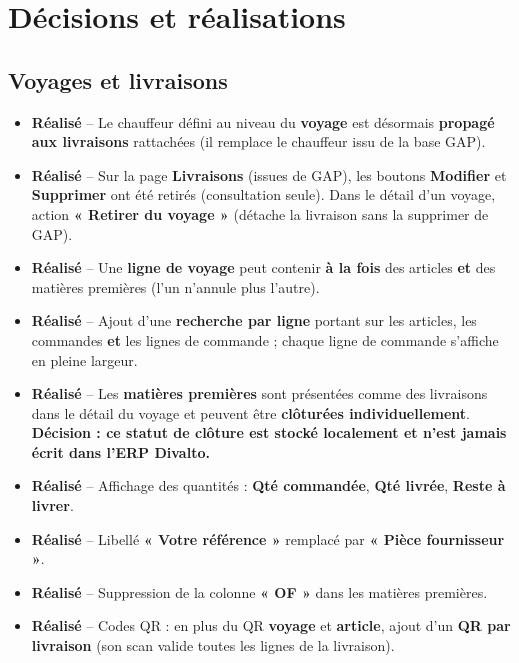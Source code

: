 \documentclass[11pt,a4paper]{article}
\newcommand{\fait}{\textcolor{vert}{\textbf{Réalisé}}}
\begin{document}
\section{Décisions et réalisations}

\subsection{Voyages et livraisons}
\begin{itemize}[leftmargin=*, itemsep=2pt]
  \item \fait{} -- Le chauffeur défini au niveau du \textbf{voyage} est désormais \textbf{propagé aux livraisons} rattachées (il remplace le chauffeur issu de la base GAP).
  \item \fait{} -- Sur la page \textbf{Livraisons} (issues de GAP), les boutons \textbf{Modifier} et \textbf{Supprimer} ont été retirés (consultation seule). Dans le détail d'un voyage, action \textbf{« Retirer du voyage »} (détache la livraison sans la supprimer de GAP).
  \item \fait{} -- Une \textbf{ligne de voyage} peut contenir \textbf{à la fois} des articles \textbf{et} des matières premières (l'un n'annule plus l'autre).
  \item \fait{} -- Ajout d'une \textbf{recherche par ligne} portant sur les articles, les commandes \textbf{et} les lignes de commande ; chaque ligne de commande s'affiche en pleine largeur.
  \item \fait{} -- Les \textbf{matières premières} sont présentées comme des livraisons dans le détail du voyage et peuvent être \textbf{clôturées individuellement}. \textbf{Décision : ce statut de clôture est stocké localement et n'est jamais écrit dans l'ERP Divalto.}
  \item \fait{} -- Affichage des quantités : \textbf{Qté commandée}, \textbf{Qté livrée}, \textbf{Reste à livrer}.
  \item \fait{} -- Libellé \textbf{« Votre référence »} remplacé par \textbf{« Pièce fournisseur »}.
  \item \fait{} -- Suppression de la colonne \textbf{« OF »} dans les matières premières.
  \item \fait{} -- Codes QR : en plus du QR \textbf{voyage} et \textbf{article}, ajout d'un \textbf{QR par livraison} (son scan valide toutes les lignes de la livraison).
\end{itemize}
\end{document}
